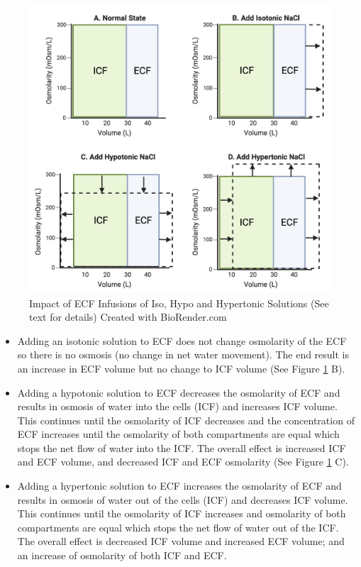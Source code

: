 \begin{figure}[!h]
    \centering
    \includegraphics[width=1\linewidth]{./figure/iso_hypo_hypertonic.png}
    \caption{Impact of ECF Infusions of Iso, Hypo and Hypertonic Solutions (See text for details) \footnotesize{Created with BioRender.com}}
    \label{fig:iso_hypo_hypertonic}
\end{figure}


\begin{itemize}
    \item Adding an isotonic solution to ECF does not change osmolarity of the ECF so there is no osmosis (no change in net water movement). The end result is an increase in ECF volume but no change to ICF volume (See Figure \ref{fig:iso_hypo_hypertonic} B).
    \item Adding a hypotonic solution to ECF decreases the osmolarity of ECF and results in osmosis of water into the cells (ICF) and increases ICF volume. This continues until the osmolarity of ICF decreases and the concentration of ECF increases until the osmolarity of both compartments are equal which stops the net flow of water into the ICF. The overall effect is increased ICF and ECF volume, and decreased ICF and ECF osmolarity (See Figure \ref{fig:iso_hypo_hypertonic} C). 
    
    
    \item Adding a hypertonic solution to ECF increases the osmolarity of ECF and results in osmosis of water out of the cells (ICF) and decreases ICF volume. This continues until the osmolarity of ICF increases and osmolarity of both compartments are equal which stops the net flow of water out of the ICF. The overall effect is decreased ICF volume and increased ECF volume; and an increase of osmolarity of both ICF and ECF.
\end{itemize}

